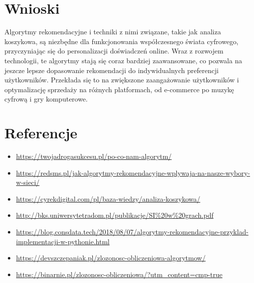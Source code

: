 \documentclass{article}
\begin{document}
\section{Wnioski}

Algorytmy rekomendacyjne i techniki z nimi związane, takie jak analiza koszykowa, są niezbędne dla funkcjonowania współczesnego świata cyfrowego, przyczyniając się do personalizacji 
doświadczeń online. Wraz z rozwojem technologii, te algorytmy stają się coraz bardziej zaawansowane, co pozwala na jeszcze lepsze dopasowanie rekomendacji do indywidualnych preferencji 
użytkowników. Przekłada się to na zwiększone zaangażowanie użytkowników i optymalizację sprzedaży na różnych platformach, od e-commerce po muzykę cyfrową i gry komputerowe.

\section{Referencje}
\begin{itemize}
    \item \url{https://twojadrogasukcesu.pl/po-co-nam-algorytm/}
    \item \url{https://redsms.pl/jak-algorytmy-rekomendacyjne-wplywaja-na-nasze-wybory-w-sieci/}
    \item \url{https://cyrekdigital.com/pl/baza-wiedzy/analiza-koszykowa/}
    \item \url{http://bks.uniwersytetradom.pl/publikacje/SI%20w%20grach.pdf}
    \item \href{https://blog.consdata.tech/2018/08/07/algorytmy-rekomendacyjne-przyklad-implementacji-w-pythonie.html}{https://blog.consdata.tech/2018/08/07/algorytmy-rekomendacyjne-przyklad-implementacji-w-pythonie.html}
    \item \url{https://devszczepaniak.pl/zlozonosc-obliczeniowa-algorytmow/}
    \item \url{https://binarnie.pl/zlozonosc-obliczeniowa/?utm_content=cmp-true}
\end{itemize}
\end{document}
